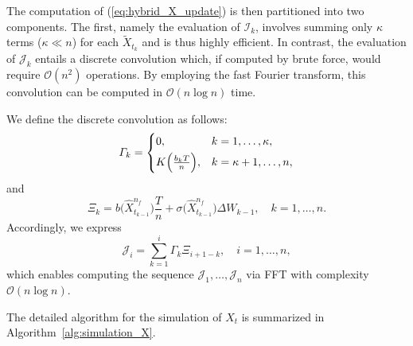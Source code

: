 \documentclass[11pt]{article}%
\theoremstyle{definition}
\begin{document}
    The computation of (\ref{eq:hybrid_X_update}) is then partitioned into two components. The first, namely the evaluation of \(\mathcal{I}_k\), involves summing only \(\kappa\) terms (\(\kappa \ll n\)) for each \(\widetilde{X}_{t_k}\) and is thus highly efficient. In contrast, the evaluation of \(\mathcal{J}_k\) entails a discrete convolution which, if computed by brute force, would require \(\mathcal{O}(n^2)\) operations. By employing the fast Fourier transform, this convolution can be computed in \(\mathcal{O}(n\log n)\) time. 
    
    We define the discrete convolution as follows:
    \[
    \varGamma_k = 
    \begin{cases}
    0, & k = 1, \dots, \kappa,\\[1mm]
    K\Bigl(\frac{b_{k}T}{n}\Bigr), & k = \kappa+1, \dots, n,
    \end{cases}
    \]
    and
    \[
    \varXi_k = b\bigl(\widehat{X}_{t_{k-1}}^{n_f}\bigr)\frac{T}{n} + \sigma\bigl(\widehat{X}_{t_{k-1}}^{n_f}\bigr) \Delta W_{k-1}, \quad k = 1, \dots, n.
    \]
    Accordingly, we express
    \begin{equation}
    \mathcal{J}_i = \sum_{k=1}^{i} \varGamma_k \varXi_{i+1-k}, \quad i = 1, \dots, n, \label{eq:fft_J}
    \end{equation}
    which enables computing the sequence \(\mathcal{J}_1, \dots, \mathcal{J}_n\) via FFT with complexity \(\mathcal{O}(n\log n)\).
    

The detailed algorithm for the simulation of \(X_t\) is summarized in Algorithm~\ref{alg:simulation_X}.
\end{document}
